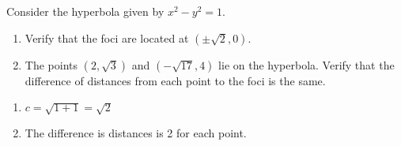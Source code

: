 {Consider the hyperbola given by $x^2-y^2=1$.
	\begin{enumerate}
	\item		Verify that the foci are located at $(\pm \sqrt{2},0)$.
	\item		The points $(2,\sqrt{3})$ and $(-\sqrt{17},4)$ lie on the hyperbola. Verify that the difference of distances from each point to the foci is the same.
	\end{enumerate}
}
{\begin{enumerate}
\item		$c=\sqrt{1+1}=\sqrt{2}$
\item		The difference is distances is 2 for each point.
\end{enumerate}
}
